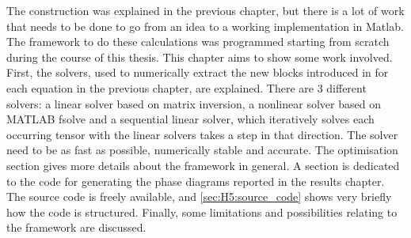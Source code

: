 The construction was explained in the previous chapter, but there is a lot of work that needs to be done to go from an idea to a working implementation in Matlab. The framework to do these calculations was programmed starting from scratch during the course of this thesis. This chapter aims to show some work involved.
First, the solvers, used to numerically extract the new blocks introduced in for each equation in the previous chapter, are explained. There are 3 different solvers: a linear solver based on matrix inversion, a nonlinear solver based on MATLAB fsolve and a sequential linear solver, which iteratively solves each occurring tensor with the linear solvers takes a step in that direction. The solver need to be as fast as possible, numerically stable and accurate.
The optimisation section gives more details about the framework in general. A section is dedicated to the code for generating the phase diagrams reported in the results chapter.  The source code is freely available, and \cref{sec:H5:source_code} shows very briefly how the code is structured. Finally, some limitations and possibilities relating to the framework are discussed.